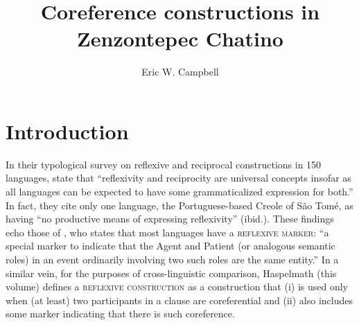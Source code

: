 \documentclass[output=paper]{../langscibook}
\author{Eric W. Campbell\affiliation{University of California, Santa Barbara}}
\title{Coreference constructions in Zenzontepec Chatino}
\begin{document}
\maketitle 


\section{Introduction}
\label{sec:campbell:1}

In their typological survey on reflexive and reciprocal constructions in 150 languages, \citet[172]{HeineMiyashita2008} state that “reflexivity and reciprocity are universal concepts insofar as all languages can be expected to have some grammaticalized expression for both.” In fact, they cite only one language, the Portuguese-based Creole of São Tomé, as having “no productive means of expressing reflexivity” (ibid.). These findings echo those of \citet[24]{Kemmer1993}, who states that most languages have a \textsc{reflexive} \textsc{marker}: “a special marker to indicate that the Agent and Patient (or analogous semantic roles) in an event ordinarily involving two such roles are the same entity.” In a similar vein, for the purposes of cross-linguistic comparison, Haspelmath (this volume) defines a \textsc{reflexive} \textsc{construction} as a construction that (i) is used only when (at least) two participants in a clause are coreferential and (ii) also includes some marker indicating that there is such coreference.
\end{document}
